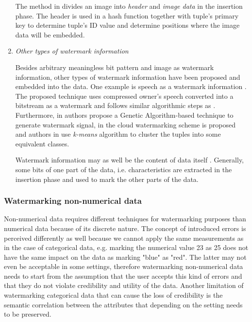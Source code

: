 \begin{enumerate}[leftmargin=*]
The method in \cite{zhou2007additive} divides an image into \textit{header} and \textit{image data}  in the insertion phase. The header is used in a hash function together with tuple's primary key to determine tuple's ID value and determine positions where the image data will be embedded.

\item \textit{Other types of watermark information}

Besides arbitrary meaningless bit pattern and image as watermark information, other types of watermark information have been proposed and embedded into the data.
One example is speech as a watermark information \cite{wang2008speech}. The proposed technique uses compressed owner's speech converted into a bitstream as a watermark and follows similar algorithmic steps as \cite{hu2009image}.
Furthermore, in \cite{cui2008approach} authors propose a Genetic Algorithm-based technique to generate watermark signal, in \cite{zhang2005method} the cloud watermarking scheme is proposed and authors in \cite{huang2009cluster} use \textit{k-means} algorithm to cluster the tuples into some equivalent classes.

Watermark information may as well be the content of data itself \cite{zhang2006relational, guo2006fragile}.
Generally, some bits of one part of the data, i.e. characteristics are extracted in the insertion phase and used to mark the other parts of the data. 
\end{enumerate}

\subsubsection{Watermarking non-numerical data}
Non-numerical data requires different techniques for watermarking purposes than numerical data because of its discrete nature. 
The concept of introduced errors is perceived differently as well because we cannot apply the same measurements as in the case of categorical data, e.g. marking the numerical value 23 as 25 does not have the same impact on the data as marking "blue" as "red". 
The latter may not even be acceptable in some settings, therefore watermarking non-numerical data needs to start from the assumption that the user accepts this kind of errors and that they do not violate credibility and utility of the data. 
Another limitation of watermarking categorical data that can cause the loss of credibility is the semantic correlation between the attributes that depending on the setting needs to be preserved.

